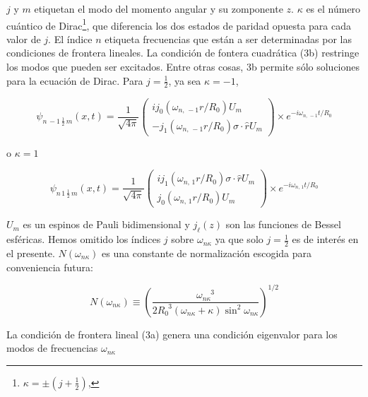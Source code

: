 $j$ y $m$ etiquetan el modo del momento angular y su zomponente $z$. $\kappa$ es el número cuántico de Dirac\footnote{$\kappa = \pm (j + \frac{1}{2})$,},  que diferencia los dos estados de paridad opuesta para cada valor de $j$.  El índice $n$ etiqueta frecuencias que están a ser determinadas por las condiciones de frontera lineales. La  condición de fontera cuadrática (3b) restringe los modos que pueden ser excitados. Entre otras cosas, 3b permite sólo soluciones para la ecuación de Dirac.
Para $j = \frac{1}{2}$, ya sea $\kappa = - 1$,

\begin{equation}\label{eq-deq-sol-k=-1}
{\psi}_{n \, -1 \, \frac{1}{2} \, m} (x,t) = \frac{1}{\sqrt{4 \pi}} 
\left( 
\begin{array}{c}
i {j}_{0} ({\omega}_{n, \, -1} r / {R}_{0}) {U}_{m} \\
- {j}_{1} ({\omega}_{n, \, -1} r / {R}_{0}) \sigma \cdot \hat{r}{U}_{m} 
\end{array}
\right) \times {e}^{- i {\omega}_{n, \, -1} t / {R}_{0}}
\end{equation}

o ${\kappa} = 1$

\begin{equation}\label{eq-deq-sol-k=1}
{\psi}_{n \, 1 \, \frac{1}{2} \, m} (x,t) = \frac{1}{\sqrt{4 \pi}} 
\left( 
\begin{array}{c}
i{j}_{1} ({\omega}_{n, \, 1} r / {R}_{0}) \sigma \cdot \hat{r} {U}_{m} \\
{j}_{0} ({\omega}_{n, \, 1} r / {R}_{0}) {U}_{m} 
\end{array}
\right) \times {e}^{- i {\omega}_{n, \, 1} t / {R}_{0}}
\end{equation}

${U}_{m}$ es un espinos de Pauli bidimensional y ${j}_{\ell}(z)$ son las funciones de Bessel esféricas. Hemos omitido los índices $j$ sobre ${\omega}_{n \kappa}$ ya que solo $j = \frac{1}{2}$ es de interés en el presente. $N({\omega}_{n \kappa})$ es una constante de normalización escogida para conveniencia futura:

\begin{equation}
N({\omega}_{n \kappa}) \equiv \left( \frac{{\omega}_{n \kappa}^{\phantom{n \kappa} 3}}{2 {R}_{0}^{\phantom{0} 3} ({\omega}_{n \kappa} + \kappa) \sin^{2} {\omega}_{n \kappa}} \right)^{1/2}
\end{equation}

La condición de frontera lineal (3a) genera una condición eigenvalor para los modos de frecuencias ${\omega}_{n \kappa}$

